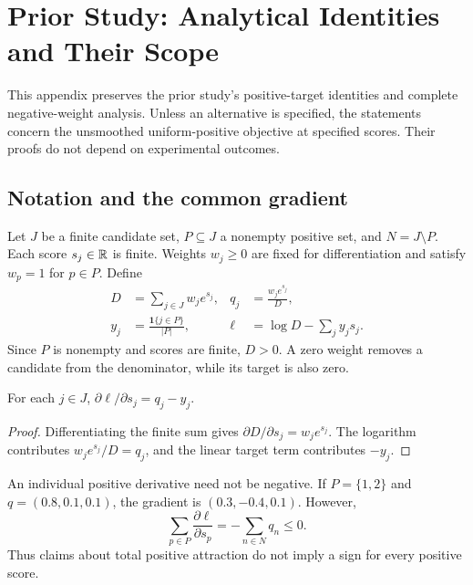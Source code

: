 \section{Prior Study: Analytical Identities and Their Scope}
\label{app:math}
This appendix preserves the prior study's positive-target identities and complete negative-weight analysis. Unless an alternative is specified, the statements concern the unsmoothed uniform-positive objective at specified scores. Their proofs do not depend on experimental outcomes.

\subsection{Notation and the common gradient}
Let $J$ be a finite candidate set, $P\subseteq J$ a nonempty positive set, and $N=J\setminus P$. Each score $s_j\in\mathbb{R}$ is finite. Weights $w_j\geq0$ are fixed for differentiation and satisfy $w_p=1$ for $p\in P$. Define
\begin{align}
D&=\sum_{j\in J}w_je^{s_j},& q_j&=\frac{w_je^{s_j}}{D},\\
y_j&=\frac{\mathbf1\{j\in P\}}{|P|},& \ell&=\log D-\sum_jy_js_j.\label{eq:row}
\end{align}
Since $P$ is nonempty and scores are finite, $D>0$. A zero weight removes a candidate from the denominator, while its target is also zero.

\begin{lemma}
For each $j\in J$, $\partial\ell/\partial s_j=q_j-y_j$.
\end{lemma}
\begin{proof}
Differentiating the finite sum gives $\partial D/\partial s_j=w_je^{s_j}$. The logarithm contributes $w_je^{s_j}/D=q_j$, and the linear target term contributes $-y_j$.
\end{proof}
An individual positive derivative need not be negative. If $P=\{1,2\}$ and $q=(0.8,0.1,0.1)$, the gradient is $(0.3,-0.4,0.1)$. However,
\begin{equation}
\sum_{p\in P}\frac{\partial\ell}{\partial s_p}=-\sum_{n\in N}q_n\leq0.
\end{equation}
Thus claims about total positive attraction do not imply a sign for every positive score.

